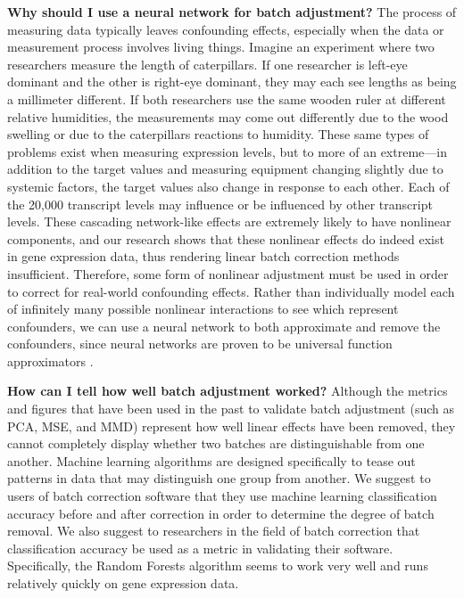 \documentclass[11pt]{article}
\begin{document}
\textbf{Why should I use a neural network for batch adjustment?}
The process of measuring data typically leaves confounding effects, especially when the data or measurement process involves living things.
Imagine an experiment where two researchers measure the length of caterpillars.
If one researcher is left-eye dominant and the other is right-eye dominant, they may each see lengths as being a millimeter different.
If both researchers use the same wooden ruler at different relative humidities, the measurements may come out differently due to the wood swelling or due to the caterpillars reactions to humidity.
These same types of problems exist when measuring expression levels, but to more of an extreme---in addition to the target values and measuring equipment changing slightly due to systemic factors, the target values also change in response to each other.
Each of the 20,000 transcript levels may influence or be influenced by other transcript levels.
These cascading network-like effects are extremely likely to have nonlinear components, and our research shows that these nonlinear effects do indeed exist in gene expression data, thus rendering linear batch correction methods insufficient.
Therefore, some form of nonlinear adjustment must be used in order to correct for real-world confounding effects.
Rather than individually model each of infinitely many possible nonlinear interactions to see which represent confounders, we can use a neural network to both approximate and remove the confounders, since neural networks are proven to be universal function approximators \citep{csaji_approximation_2001}.

\textbf{How can I tell how well batch adjustment worked?}
Although the metrics and figures that have been used in the past to validate batch adjustment (such as PCA, MSE, and MMD) represent how well linear effects have been removed, they cannot completely display whether two batches are distinguishable from one another.
Machine learning algorithms are designed specifically to tease out patterns in data that may distinguish one group from another.
We suggest to users of batch correction software that they use machine learning classification accuracy before and after correction in order to determine the degree of batch removal.
We also suggest to researchers in the field of batch correction that classification accuracy be used as a metric in validating their software.
Specifically, the Random Forests algorithm \citep{tin_kam_ho_random_1995} seems to work very well and runs relatively quickly on gene expression data.
\end{document}
